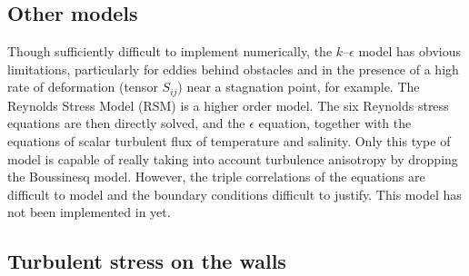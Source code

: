 \subsection{Other models}

Though sufficiently difficult to implement numerically, the $k$--$\epsilon$
model has obvious limitations, particularly for eddies behind obstacles and in
the presence of a high rate of deformation (tensor $S_{ij}$) near a stagnation
point, for example. The Reynolds Stress Model (RSM) is a higher order model. The six
Reynolds stress%
equations are then directly solved, and the $\epsilon$ equation, together
with the equations of scalar turbulent flux of temperature and salinity. Only
this type of model is capable of really taking into account turbulence
anisotropy by dropping the Boussinesq model. However, the triple
correlations of the equations are difficult to model and the boundary
conditions difficult to justify. This model has not been implemented in  yet.

\subsection{\label{contraintes turbulentes}Turbulent stress on the walls}

